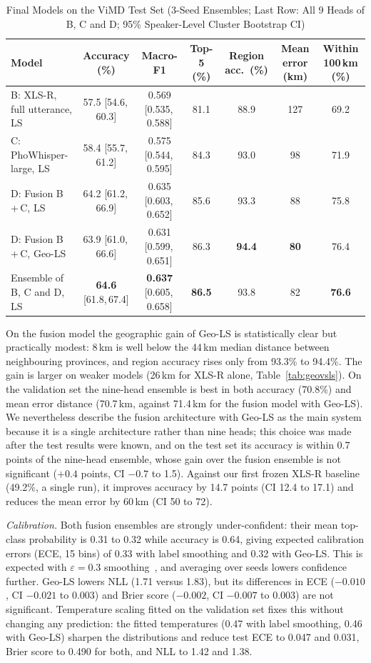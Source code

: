 \documentclass[conference]{IEEEtran}
\newcommand{\ci}[2]{\scriptsize[#1,\,#2]}
\begin{document}
\begin{table}[t]
\centering
\caption{Final Models on the ViMD Test Set (3-Seed Ensembles; Last Row: All 9 Heads of B, C and D; 95\% Speaker-Level Cluster Bootstrap CI)}
\label{tab:final}
\begin{tabular}{@{}lcccccc@{}}
\toprule
Model & Accuracy (\%) & Macro-F1 & Top-5 (\%) & Region acc.\ (\%) & Mean error (km) & Within 100\,km (\%) \\
\midrule
B: XLS-R, full utterance, LS & 57.5 \ci{54.6}{60.3} & 0.569 \ci{0.535}{0.588} & 81.1 & 88.9 & 127 & 69.2 \\
C: PhoWhisper-large, LS & 58.4 \ci{55.7}{61.2} & 0.575 \ci{0.544}{0.595} & 84.3 & 93.0 & 98 & 71.9 \\
D: Fusion B\,+\,C, LS & 64.2 \ci{61.2}{66.9} & 0.635 \ci{0.603}{0.652} & 85.6 & 93.3 & 88 & 75.8 \\
D: Fusion B\,+\,C, Geo-LS & 63.9 \ci{61.0}{66.6} & 0.631 \ci{0.599}{0.651} & 86.3 & \textbf{94.4} & \textbf{80} & 76.4 \\
Ensemble of B, C and D, LS & \textbf{64.6} \ci{61.8}{67.4} & \textbf{0.637} \ci{0.605}{0.658} & \textbf{86.5} & 93.8 & 82 & \textbf{76.6} \\
\bottomrule
\end{tabular}
\end{table}

On the fusion model the geographic gain of Geo-LS is statistically clear but practically modest: 8\,km is well below the 44\,km median distance between neighbouring provinces, and region accuracy rises only from 93.3\% to 94.4\%. The gain is larger on weaker models (26\,km for XLS-R alone, Table~\ref{tab:geovsls}). On the validation set the nine-head ensemble is best in both accuracy (70.8\%) and mean error distance (70.7\,km, against 71.4\,km for the fusion model with Geo-LS). We nevertheless describe the fusion architecture with Geo-LS as the main system because it is a single architecture rather than nine heads; this choice was made after the test results were known, and on the test set its accuracy is within 0.7 points of the nine-head ensemble, whose gain over the fusion ensemble is not significant ($+0.4$ points, CI $-0.7$ to 1.5). Against our first frozen XLS-R baseline (49.2\%, a single run), it improves accuracy by 14.7 points (CI 12.4 to 17.1) and reduces the mean error by 60\,km (CI 50 to 72).

\textit{Calibration.} Both fusion ensembles are strongly under-confident: their mean top-class probability is 0.31 to 0.32 while accuracy is 0.64, giving expected calibration errors (ECE, 15 bins) of 0.33 with label smoothing and 0.32 with Geo-LS. This is expected with $\varepsilon = 0.3$ smoothing~\cite{muller}, and averaging over seeds lowers confidence further. Geo-LS lowers NLL (1.71 versus 1.83), but its differences in ECE ($-0.010$, CI $-0.021$ to 0.003) and Brier score ($-0.002$, CI $-0.007$ to 0.003) are not significant. Temperature scaling fitted on the validation set fixes this without changing any prediction: the fitted temperatures (0.47 with label smoothing, 0.46 with Geo-LS) sharpen the distributions and reduce test ECE to 0.047 and 0.031, Brier score to 0.490 for both, and NLL to 1.42 and 1.38.
\end{document}
